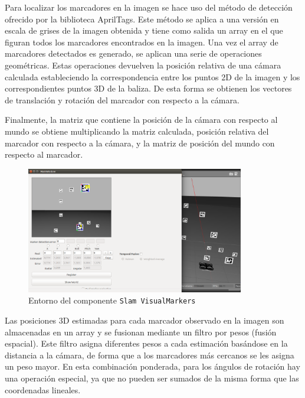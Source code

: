 \hspace{1cm} Para localizar los marcadores en la imagen se hace uso del método de detección ofrecido por la biblioteca AprilTags. Este método se aplica a una versión en escala de grises de la imagen obtenida y tiene como salida un array en el que figuran todos los marcadores encontrados en la imagen. Una vez el array de marcadores detectados es generado, se aplican una serie de operaciones geométricas. Estas operaciones devuelven la posición relativa de una cámara calculada estableciendo la correspondencia entre los puntos 2D de la imagen y los correspondientes puntos 3D de la baliza. De esta forma se obtienen los vectores de translación y rotación del marcador con respecto a la cámara.

\hspace{1cm} Finalmente, la matriz que contiene la posición de la cámara con respecto al mundo se obtiene multiplicando la matriz calculada, posición relativa del marcador con respecto a la cámara, y la matriz de posición del mundo con respecto al marcador. 

\begin{figure}[H]
	\begin{center}
		\includegraphics[width=0.85\textwidth]{imag/IMG35.png}
				\caption{Entorno del componente \texttt{Slam VisualMarkers}}
		\label{fig:Ejemplo Slam VisualMarkers.}	
	\end{center}
\end{figure}

\hspace{1cm} Las posiciones 3D estimadas para cada marcador observado en la imagen son almacenadas en un array y se fusionan mediante un filtro por pesos (fusión espacial). Este filtro asigna diferentes pesos a cada estimación basándose en la distancia a la cámara, de forma que a los marcadores más cercanos se les asigna un peso mayor. En esta combinación ponderada, para los ángulos de rotación hay una operación especial, ya que no pueden ser sumados de la misma forma que las coordenadas lineales. 

